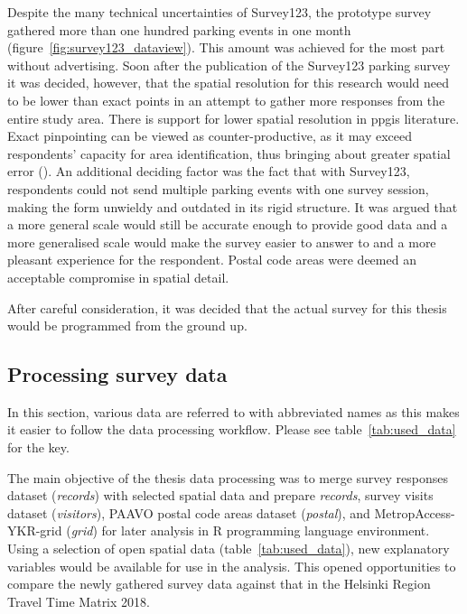 Despite the many technical uncertainties of Survey123, the prototype survey gathered more than one hundred parking events in one month (figure~\ref{fig:survey123_dataview}). This amount was achieved for the most part without advertising. Soon after the publication of the Survey123 parking survey it was decided, however, that the spatial resolution for this research would need to be lower than exact points in an attempt to gather more responses from the entire study area. There is support for lower spatial resolution in \gls{ppgis} literature. Exact pinpointing can be viewed as counter-productive, as it may exceed respondents' capacity for area identification, thus bringing about greater spatial error (\cite{Brown2012}). An additional deciding factor was the fact that with Survey123, respondents could not send multiple parking events with one survey session, making the form unwieldy and outdated in its rigid structure. It was argued that a more general scale would still be accurate enough to provide good data and a more generalised scale would make the survey easier to answer to and a more pleasant experience for the respondent. Postal code areas were deemed an acceptable compromise in spatial detail.

After careful consideration, it was decided that the actual survey for this thesis would be programmed from the ground up.

\subsection{Processing survey data}
\label{sec:c3-processdata} %
\justify

In this section, various data are referred to with abbreviated names as this makes it easier to follow the data processing workflow. Please see table~\ref{tab:used_data} for the key.

The main objective of the thesis data processing was to merge survey responses dataset (\textit{records}) with selected spatial data and prepare \textit{records}, survey visits dataset (\textit{visitors}), PAAVO postal code areas dataset (\textit{postal}), and MetropAccess-YKR-grid (\textit{grid}) for later analysis in R programming language environment. Using a selection of open spatial data (table~\ref{tab:used_data}), new explanatory variables would be available for use in the analysis. This opened opportunities to compare the newly gathered survey data against that in the Helsinki Region Travel Time Matrix 2018.

